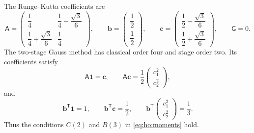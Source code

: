\documentclass[11pt,a4paper]{article}
\newcommand{\bs}{\boldsymbol}
\theoremstyle{definition}
\numberwithin{equation}{section}
\begin{document}
The Runge--Kutta coefficients are
\begin{equation}\label{eq:ho:order-three-coefficients}
 \mathsf A=
 \begin{pmatrix}
 \dfrac14&
 \dfrac14-\dfrac{\sqrt3}{6}
 \\[2mm]
 \dfrac14+\dfrac{\sqrt3}{6}&
 \dfrac14
 \end{pmatrix},
 \qquad
 \bs b=
 \begin{pmatrix}
 \dfrac12\\[1mm]\dfrac12
 \end{pmatrix},
 \qquad
 \bs c=
 \begin{pmatrix}
 \dfrac12-\dfrac{\sqrt3}{6}\\[1mm]
 \dfrac12+\dfrac{\sqrt3}{6}
 \end{pmatrix},\qquad
 \mathsf G = 0.
\end{equation}
%
The two-stage Gauss method has classical order four and stage order
two. Its coefficients satisfy
\begin{equation}\label{eq:ho:order-three-moments}
 \mathsf A\bs 1=\bs c,
 \qquad
 \mathsf A\bs c
 =
 \frac12
 \begin{pmatrix}
 c_1^2\\ c_2^2
 \end{pmatrix},
\end{equation}
and
\begin{equation}\label{eq:ho:order-three-quadrature}
 \bs b^{\mathsf T}\bs 1=1,
 \qquad
 \bs b^{\mathsf T}\bs c=\frac12,
 \qquad
 \bs b^{\mathsf T}
 \begin{pmatrix}
 c_1^2\\ c_2^2
 \end{pmatrix}
 =\frac13.
\end{equation}
Thus the conditions \(C(2)\) and \(B(3)\) in
\eqref{eq:ho:moments} hold.

\end{document}

